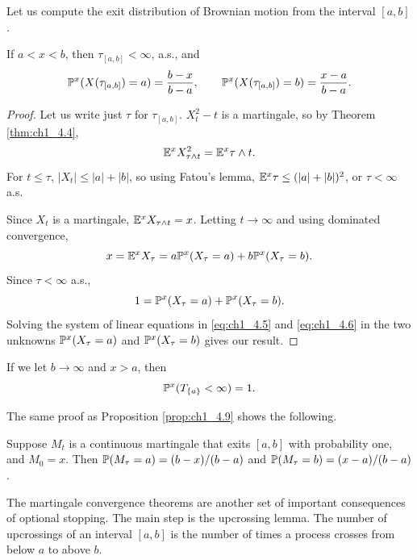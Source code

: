 Let us compute the exit distribution of Brownian motion from the interval $[a,b]$.

\begin{proposition}\label{prop:ch1_4.9}
If $a < x < b$, then $\tau_{[a,b]} < \infty$, a.s., and
\mpagebreak
\[
    \P^x(X(\tau_{[a,b]}) = a) = \frac{b-x}{b-a}, \qquad \P^x(X(\tau_{[a,b]}) = b) = \frac{x-a}{b-a}.
\]
\end{proposition}

\begin{proof}
Let us write just $\tau$ for $\tau_{[a,b]}$. $X_t^2 - t$ is a martingale, so by Theorem \ref{thm:ch1_4.4},
\[
    \E^x X_{\tau\wedge t}^2 = \E^x\tau \wedge t.
\]
For $t \leq \tau$, $|X_t| \leq |a| + |b|$, so using Fatou's lemma, $\E^x\tau \leq (|a| + |b|)^2$, or $\tau < \infty$ a.s.

Since $X_t$ is a martingale, $\E^x X_{\tau\wedge t} = x$. Letting $t \to \infty$ and using dominated convergence,
\begin{equation}\label{eq:ch1_4.5}
    x = \E^x X_\tau = a\P^x(X_\tau = a) + b\P^x(X_\tau = b).
\end{equation}
Since $\tau < \infty$ a.s.,
\begin{equation}\label{eq:ch1_4.6}
    1 = \P^x(X_\tau = a) + \P^x(X_\tau = b).
\end{equation}
Solving the system of linear equations in \eqref{eq:ch1_4.5} and \eqref{eq:ch1_4.6} in the two unknowns $\P^x(X_\tau = a)$ and $\P^x(X_\tau = b)$ gives our result.
\end{proof}

If we let $b \to \infty$ and $x > a$, then
\begin{equation}\label{eq:ch1_4.7}
    \P^x(T_{\{a\}} < \infty) = 1.
\end{equation}

The same proof as Proposition \ref{prop:ch1_4.9} shows the following.

\begin{corollary}\label{cor:ch1_4.10}
Suppose $M_t$ is a continuous martingale that exits $[a,b]$ with probability one, and $M_0 = x$. Then $\P(M_\tau = a) = (b-x)/(b-a)$ and $\P(M_\tau = b) = (x-a)/(b-a)$.
\end{corollary}


The martingale convergence theorems are another set of important consequences of optional stopping. The main step is the upcrossing lemma. The number of upcrossings of an interval $[a,b]$ is the number of times a process crosses from below $a$ to above $b$.

